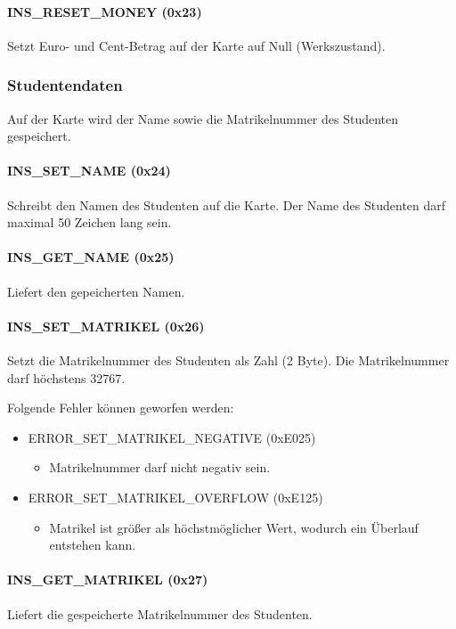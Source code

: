 \paragraph{INS\_RESET\_MONEY (0x23)}
Setzt Euro- und Cent-Betrag auf der Karte auf Null (Werkszustand).

\subsubsection{Studentendaten}
Auf der Karte wird der Name sowie die Matrikelnummer des Studenten gespeichert.

\paragraph{INS\_SET\_NAME (0x24)}
Schreibt den Namen des Studenten auf die Karte.
Der Name des Studenten darf maximal 50 Zeichen lang sein.

\paragraph{INS\_GET\_NAME (0x25)}
Liefert den gepeicherten Namen.

\paragraph{INS\_SET\_MATRIKEL (0x26)}
Setzt die Matrikelnummer des Studenten als Zahl (2 Byte).
Die Matrikelnummer darf höchstens 32767.

Folgende Fehler können geworfen werden:
\begin{itemize}
	\item ERROR\_SET\_MATRIKEL\_NEGATIVE (0xE025)
	\begin{itemize}
		\item Matrikelnummer darf nicht negativ sein.
	\end{itemize}
	\item ERROR\_SET\_MATRIKEL\_OVERFLOW (0xE125)
	\begin{itemize}
		\item Matrikel ist größer als höchstmöglicher Wert, wodurch ein Überlauf entstehen kann.
	\end{itemize}
\end{itemize}

\paragraph{INS\_GET\_MATRIKEL (0x27)}
Liefert die gespeicherte Matrikelnummer des Studenten.


